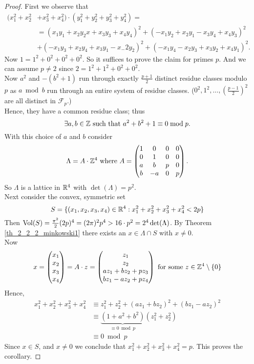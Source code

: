 \documentclass[NumTh.tex]{subfiles}
\begin{document}
\begin{proof}
  First we observe that 
  \begin{align*}
    (x_1^2 + x_2^2 &+ x_3^2 + x_4^2) \cdot (y_1^2 + y_2^2 + y_3^2 + y_4^2) = \\
    &= (x_1 y_1 + x_2 y_2 x + x_3 y_3 + x_4 y_4)^2 + (-x_1 y_2 + x_2 y_1 -x_3 y_4 + x_4y_3)^2 \\
    &+ (-x_1 y_3 + x_2 y_4 + x_3 y_1 - x_-2 y_2)^2 + (-x_1 y_4 - x_2 y_3 + x_3y_2 + x_4 y_1)^2 \text{.}
  \end{align*}
  Now $1 = 1^2 + 0^2 + 0^2 + 0^2$. So it suffices to prove the claim for primes $p$.
  And we can assume $p \neq 2$ since $2 = 1^2 + 1^2 +0^2 + 0^2$. \\
  Now $a^2$ and $-(b^2 + 1)$ run through exactly $\frac{p+1}{2}$ distinct residue classes modulo $p$ as $a \bmod b$ run through an entire system of residue classes. ($0^2, 1^2, \dots, \left( \frac{p-1}{2} \right)^2$ are all distinct in $\mathcal{F}_p$.)\\
  Hence, they have a common residue class; thus 
  \[ \exists a,b \in \mathbb{Z} \text{ such that } a^2 + b^2 +1 \equiv 0 \bmod p \text{.} \]
  With this choice of $a$ and $b$ consider
  \[ \Lambda = A \cdot \mathbb{Z}^4 \text{ where } A= \left( 
  \begin{matrix}
    1 & 0 & 0 & 0\\
    0 & 1 & 0 & 0\\
    a & b & p &  0\\
    b & -a & 0 & p
  \end{matrix} \right) \text{.}\]
  So $\Lambda$ is a lattice in $\mathbb{R}^4$ with $\det(\Lambda) = p^2$.\\
  Next consider the convex, symmetric set 
  \[ S = \{ (x_1,x_2,x_3,x_4) \in \mathbb{R}^4 : x_1^2 + x_2^2 + x_3^2 + x_4^2 < 2p \} \]
  Then $\operatorname{Vol}(S) = \frac{\pi^2}{2} (2p)^4 = (2 \pi)^2 p^4 > 16 \cdot p^2 = 2^4 \det(\Lambda)$.
  By Theorem \ref{th_2_2_2_minkowski1} there exists an $x \in \Lambda \cap S$ with $x \neq 0$.\\
  Now 
  \[ x = \left(
  \begin{matrix}
    x_1 \\
    x_2 \\
    x_3 \\
    x_4
  \end{matrix} \right)
  = A \cdot z = \left(
  \begin{matrix}
    z_1 \\
    z_2 \\
    a z_1 + b z_2 + p z_3 \\
    b z_1 - a z_2 + p z_4
  \end{matrix} \right) \text{ for some } z \in \mathbb{Z}^4 \setminus \{0\} \]
  Hence,
  \begin{align*}
    x_1^2 + x_2^2 + x_3^2 + x_4^2 &\equiv z_1^2 + z_2^2 + (a z_1 + b z_2)^2 + (b z_1 - a z_2)^2 \\
    &\equiv \underbrace{(1 + a^2 + b^2)}_{\equiv 0 \bmod p} (z_1^2 + z_2^2) \\
    &\equiv 0 \bmod p
  \end{align*}
  Since $x \in S$, and $x \neq 0$ we conclude that $x_1^2 + x_2^2 + x_3^2 + x_4^2 = p$.
  This proves the corollary.
\end{proof}
\end{document}
